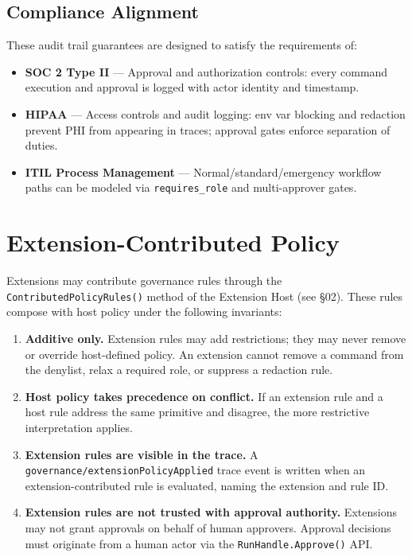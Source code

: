 \subsection{Compliance Alignment}

These audit trail guarantees are designed to satisfy the requirements of:
\begin{itemize}
  \item \textbf{SOC 2 Type II} --- Approval and authorization controls: every command execution and
        approval is logged with actor identity and timestamp.
  \item \textbf{HIPAA} — Access controls and audit logging: env var blocking and redaction
        prevent PHI from appearing in traces; approval gates enforce separation of duties.
  \item \textbf{ITIL Process Management} --- Normal/standard/emergency workflow paths can be
        modeled via \texttt{requires\_role} and multi-approver gates.
\end{itemize}

\section{Extension-Contributed Policy}

Extensions may contribute governance rules through the \texttt{ContributedPolicyRules()}
method of the Extension Host (see §02). These rules compose with host policy under the
following invariants:

\begin{enumerate}
  \item \textbf{Additive only.} Extension rules may add restrictions; they may never
        remove or override host-defined policy. An extension cannot remove a command
        from the denylist, relax a required role, or suppress a redaction rule.
  \item \textbf{Host policy takes precedence on conflict.} If an extension rule and a
        host rule address the same primitive and disagree, the more restrictive interpretation
        applies.
  \item \textbf{Extension rules are visible in the trace.} A
        \texttt{governance/extensionPolicyApplied} trace event is written when an
        extension-contributed rule is evaluated, naming the extension and rule ID.
  \item \textbf{Extension rules are not trusted with approval authority.} Extensions may
        not grant approvals on behalf of human approvers. Approval decisions must originate
        from a human actor via the \texttt{RunHandle.Approve()} API.
\end{enumerate}

